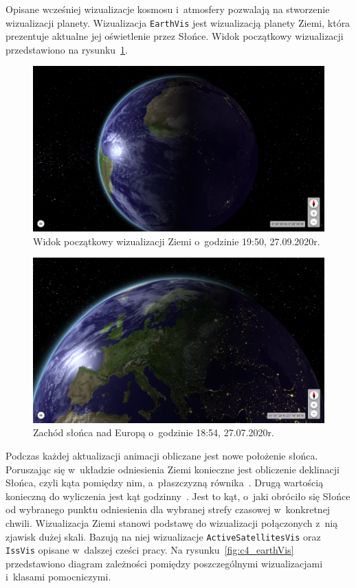 Opisane wcześniej wizualizacje kosmosu i~atmosfery pozwalają na stworzenie wizualizacji planety. Wizualizacja \texttt{EarthVis} jest wizualizacją planety Ziemi, która prezentuje aktualne jej oświetlenie przez Słońce. Widok początkowy wizualizacji przedstawiono na rysunku~\ref{fig:c4_earthVis_1}. 


\begin{figure}
  \centering
  \includegraphics[width=\linewidth]{img/c4_earthVis_1.png}
  \caption{Widok początkowy wizualizacji Ziemi o~godzinie 19:50, 27.09.2020r.}
  \label{fig:c4_earthVis_1} 
\end{figure}
  

\begin{figure}
  \centering
  \includegraphics[width=\linewidth]{img/c4_earthVis_2.png}
  \caption{Zachód słońca nad Europą o~godzinie 18:54, 27.07.2020r.}
  \label{fig:c4_earthVis_2} 
\end{figure}
  
Podczas każdej aktualizacji animacji obliczane jest nowe położenie słońca. Poruszając się w~układzie odniesienia Ziemi konieczne jest obliczenie deklinacji Słońca, czyli kąta pomiędzy nim, a~płaszczyzną równika~\cite{Declination}. Drugą wartością konieczną do wyliczenia jest kąt godzinny~\cite{SolarTime}. Jest to kąt, o~jaki obróciło się Słońce od wybranego punktu odniesienia dla wybranej strefy czasowej w~konkretnej chwili. Wizualizacja Ziemi stanowi podstawę do wizualizacji połączonych z~nią zjawisk dużej skali. Bazują na niej wizualizacje \texttt{ActiveSatellitesVis} oraz \texttt{IssVis} opisane w~dalszej cześci pracy. Na rysunku~\ref{fig:c4_earthVis} przedstawiono diagram zależności pomiędzy poszczególnymi wizualizacjami i~klasami pomocniczymi.

